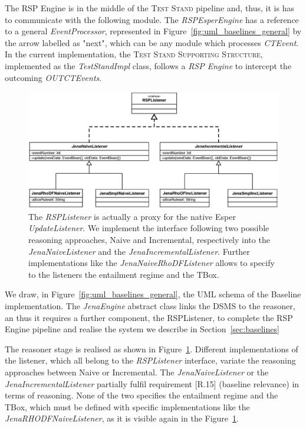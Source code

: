 The RSP Engine is in the middle of the \textsc{Test Stand} pipeline and, thus, it is has to communicate with the following module. The \textit{RSPEsperEngine} has a reference to a general \textit{EventProcessor}, represented in Figure~\ref{fig:uml_baselines_general}  by the arrow labelled as "next", which can be any module which processes \textit{CTEvent}. In the current implementation, the \textsc{Test Stand Supporting Structure}, implemented as the \textit{TestStandImpl} class, follows a \textit{RSP Engine} to intercept the outcoming \textit{OUTCTEvents}.

\begin{figure}[tbh]
  \centering
	\includegraphics[width=\linewidth]{images/uml_baselines_listener}
	\caption[\textit{RSPListener} Implementations - UML Schema]{The \textit{RSPListener} is actually a proxy for the native Esper \textit{UpdateListener}. We implement the interface following two possible reasoning approaches, Naive and Incremental, respectively into the  \textit{JenaNaiveListener} and the \textit{JenaIncrementalListener}. Further implementations like the \textit{JenaNaiveRhoDFListener} allows to specify to the listeners the entailment regime and the TBox.} 
  	\label{fig:uml_baselines_listener}
\end{figure}

We draw, in Figure~\ref{fig:uml_baselines_general}, the UML schema of the Baseline implementation. The \textit{JenaEngine} abstract class links the DSMS to the reasoner, an thus it requires a further component, the RSPListener, to complete the RSP Engine pipeline and realise the system we describe in Section~\ref{sec:baselines}
 
The reasoner stage is realised as shown in Figure~\ref{fig:uml_baselines_listener}. Different implementations of the listener, which all belong to the \textit{RSPListener} interface, variate the reasoning approaches between Naive or Incremental. The \textit{JenaNaiveListener} or the \textit{JenaIncrementalListener} partially fulfil requirement [R.15] (baseline relevance) in terms of reasoning. None of the two specifies the entailment regime and the TBox, which must be defined with specific implementations like the \textit{JenaRHODFNaiveListener}, as it is visible again in the Figure~\ref{fig:uml_baselines_listener}.

